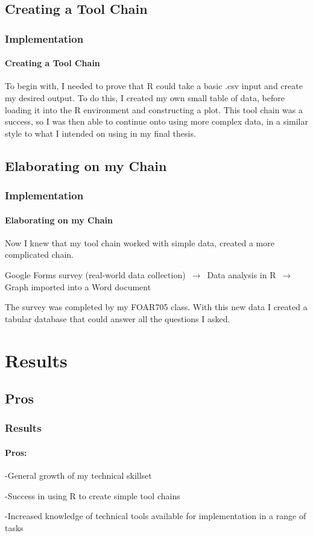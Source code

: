 \documentclass{beamer}
\begin{document}
\subsection{Creating a Tool Chain}
\begin{frame}
\frametitle{Implementation}
\framesubtitle{Creating a Tool Chain}
To begin with, I needed to prove that R could take a basic .csv input and create my desired output. To do this, I created my own small table of data, before loading it into the R environment and constructing a plot.  
\newline
\newline
This tool chain was a success, so I was then able to continue onto using more complex data, in a similar style to what I intended on using in my final thesis.
\end{frame}

\subsection{Elaborating on my Chain}
\begin{frame}
\frametitle{Implementation}
\framesubtitle{Elaborating on my Chain}
Now I knew that my tool chain worked with simple data, created a more complicated chain. 
\begin{center}
Google Forms survey (real-world data collection) 
\newline
$\,\to\,$
Data analysis in R
\newline
$\,\to\,$ 
Graph imported into a Word document
\end{center}
\newline
The survey was completed by my FOAR705 class. With this new data I created a tabular database that could answer all the questions I asked.
\end{frame}

\section{Results}
\subsection{Pros}
\begin{frame}
\frametitle{Results}
\framesubtitle{Pros:}
\item -General growth of my technical skillset
\item -Success in using R to create simple tool chains
\item -Increased knowledge of technical tools available for implementation in a range of tasks
\end{frame}
\end{document}
